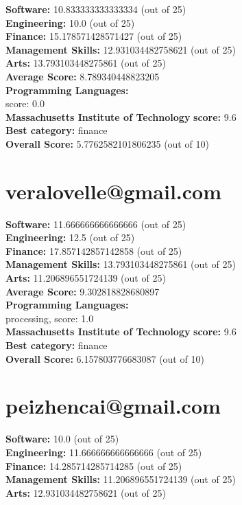 \documentclass{article}
\begin{document}
\textbf{Software:} 10.833333333333334 (out of 25)\\
\textbf{Engineering: } 10.0 (out of 25)\\
\textbf{Finance:} 15.178571428571427 (out of 25)\\
\textbf{Management Skills:} 12.931034482758621 (out of 25)\\
\textbf{Arts:} 13.793103448275861 (out of 25)\\
\textbf{Average Score: } 8.789340448823205\\
\textbf{Programming Languages:} \\
score: 0.0\\
\textbf{Massachusetts Institute of Technology} \textbf{score:} 9.6\\
\textbf{Best category: } finance\\
\textbf{Overall Score: }5.7762582101806235 (out of 10)\section{veralovelle@gmail.com}
\textbf{Software:} 11.666666666666666 (out of 25)\\
\textbf{Engineering: } 12.5 (out of 25)\\
\textbf{Finance:} 17.857142857142858 (out of 25)\\
\textbf{Management Skills:} 13.793103448275861 (out of 25)\\
\textbf{Arts:} 11.206896551724139 (out of 25)\\
\textbf{Average Score: } 9.302818828680897\\
\textbf{Programming Languages:} \\
processing, score: 1.0\\
\textbf{Massachusetts Institute of Technology} \textbf{score:} 9.6\\
\textbf{Best category: } finance\\
\textbf{Overall Score: }6.157803776683087 (out of 10)\section{peizhencai@gmail.com}
\textbf{Software:} 10.0 (out of 25)\\
\textbf{Engineering: } 11.666666666666666 (out of 25)\\
\textbf{Finance:} 14.285714285714285 (out of 25)\\
\textbf{Management Skills:} 11.206896551724139 (out of 25)\\
\textbf{Arts:} 12.931034482758621 (out of 25)\\
\end{document}
